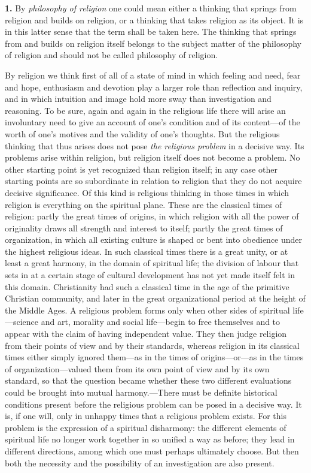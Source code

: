 \documentclass[12pt,a4paper]{book}
\newcommand{\opage}[1]{\marginnote{\footnotesize\textit{[#1]}}}
\begin{document}
\noindent\textbf{1.} By \emph{philosophy of religion} one could mean
either a thinking that springs from religion and builds on religion, or a
thinking that takes religion as its object. It is in this latter sense
that the term shall be taken here. The thinking that springs from and
builds on religion itself belongs to the subject matter of the philosophy
of religion and should not be called philosophy of religion.

By religion we think first of all of a state of mind in which feeling
and need, fear and hope, enthusiasm and devotion play a larger role than
reflection and inquiry, and in which intuition and image hold more sway
than investigation and reasoning. To be sure, again and again in the
religious life there will arise an involuntary need to give an account
of one's condition and of its content---of the worth of one's motives
and the validity of one's thoughts. But the religious thinking that thus
arises does not pose \emph{the religious problem} in a decisive way. Its
problems arise within religion, but religion itself does not become a
problem. No other starting point is yet recognized than religion
itself; in any case other starting points are so subordinate in relation
to religion that they do not acquire decisive significance. Of this kind
is religious thinking in those times in which religion is everything on
the spiritual plane. These are the classical times of religion: partly
the great times of origins, in which religion with all the power of
originality draws all strength and interest to itself; partly the great
times of organization, in which all existing culture is shaped or bent
into obedience under the highest religious ideas. In such classical
times there is a great unity, or at least a great harmony, in the domain
of spiritual life; the division of labour that sets in at a certain stage
of cultural development has not yet made itself felt in this domain.
Christianity had such a classical time in the age of
the primitive Christian community, and later in the great 
\opage{4}organizational
period at the height of the Middle Ages. A religious problem forms only
when other sides of spiritual life---science and art, morality and
social life---begin to free themselves and to appear with the claim of
having independent value. They then judge religion from their points of
view and by their standards, whereas religion in its classical times
either simply ignored them---as in the times of origins---or---as in the
times of organization---valued them from its own point of view and by
its own standard, so that the question became whether these two
different evaluations could be brought into mutual harmony.---There must
be definite historical conditions present before the religious problem
can be posed in a decisive way. It is, if one will, only in unhappy
times that a religious problem exists. For this problem is the
expression of a spiritual disharmony: the different elements of
spiritual life no longer work together in so unified a way as before;
they lead in different directions, among which one must perhaps
ultimately choose. But then both the necessity and the possibility of an
investigation are also present.
\end{document}
